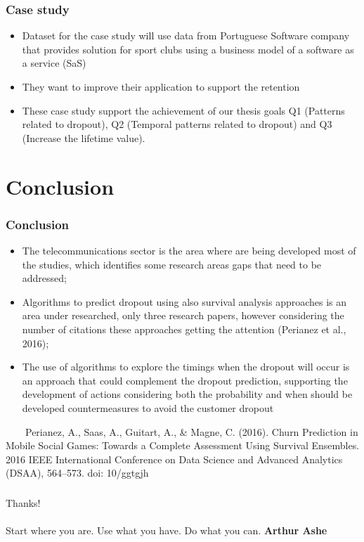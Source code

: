 \documentclass[10pt]{beamer}
\begin{document}
\begin{frame}
	\frametitle{Case study}
	\begin{itemize}
		\item Dataset for the case study will use data from Portuguese Software company that provides solution for sport 
		clubs using a business model of a software as a service (SaS)
		\item They want to improve their application to support the retention
		\item These case study support the achievement of our thesis goals Q1 (Patterns related to dropout), Q2 (Temporal patterns related to dropout) and Q3 (Increase the lifetime value).
	\end{itemize}
\end{frame}
\section{Conclusion}
\begin{frame}
	\frametitle{Conclusion}
	\begin{itemize}
 		\item The telecommunications sector is the area where are being developed most of the studies, which identifies some research areas gaps that need to be addressed;
 		\item Algorithms to predict dropout using also survival analysis approaches is an area under researched, only three research papers, however  considering the number of citations these approaches getting the attention (Perianez et al., 2016);
 		\item The use of algorithms to explore the timings when the dropout will occur is an approach that could complement the dropout prediction, supporting the development of actions considering both the probability and when should be developed countermeasures to avoid the customer dropout
	\end{itemize}
	\tiny 
	~~~~Perianez, A., Saas, A., Guitart, A., \& Magne, C. (2016). Churn Prediction in Mobile Social Games: Towards a Complete Assessment Using Survival Ensembles. 2016 IEEE International Conference on Data Science and Advanced Analytics (DSAA), 564–573. doi: 10/ggtgjh

\end{frame}


\begin{frame}
\frametitle{}
\normalsize
	\Huge Thanks! \\~\\
	\Large Start where you are. Use what you have. Do what you can. \textbf{Arthur Ashe}
\end{frame}
\end{document}
